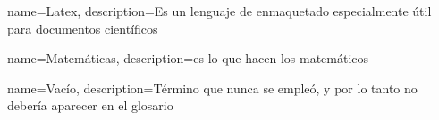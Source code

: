 



% 



{
    name=Latex,
    description={Es un lenguaje de enmaquetado especialmente útil
    para documentos científicos}
}

{
    name=Matemáticas,
    description={es lo que hacen los matemáticos}
}

{
    name=Vacío,
    description={Término que nunca se empleó, y por lo tanto no debería
    aparecer en el glosario}
}
